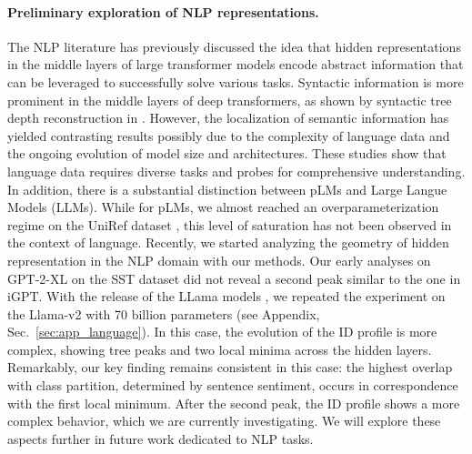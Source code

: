 \documentclass{article}
\begin{document}
\paragraph{Preliminary exploration of NLP representations.} 
The NLP literature has previously discussed the idea that hidden representations in the middle layers of large transformer models encode abstract information that can be leveraged to successfully solve various tasks. 
%
Syntactic information is more prominent in the middle layers of deep transformers, as shown by syntactic tree depth reconstruction in \cite{hewitt-manning-2019-structural}. However, the localization of semantic information has yielded contrasting results \cite{belinkov-etal-2017-evaluating,blevins2018,liu-etal-2019-linguistic, tenney-etal-2019-bert, rogers-etal-2020-primer} possibly due to the complexity of language data and the ongoing evolution of model size and architectures. 
%
These studies show that language data requires diverse tasks and probes for comprehensive understanding. In addition, there is a substantial distinction between pLMs and Large Langue Models (LLMs).
%
While for pLMs, we almost reached an overparameterization regime on the UniRef dataset \cite{lin2022language}, this level of saturation has not been observed in the context of language.
%
Recently, we started analyzing the geometry of hidden representation in the NLP domain with our methods. 
%
Our early analyses on GPT-2-XL on the SST dataset \cite{sst2} did not reveal a second peak similar to the one in iGPT. 
%
With the release of the LLama models \cite{touvron2023llama}, we repeated the experiment on the Llama-v2 with 70 billion parameters (see Appendix, Sec.~\ref{sec:app_language}).
%
In this case, the evolution of the ID profile is more complex, showing tree peaks and two local minima across the hidden layers.
%
Remarkably, our key finding remains consistent in this case: the highest overlap with class partition, determined by sentence sentiment, occurs in correspondence with the first local minimum. 
%
After the second peak, the ID profile shows a more complex behavior, which we are currently investigating.  We will explore these aspects further in future work dedicated to NLP tasks.
\end{document}
